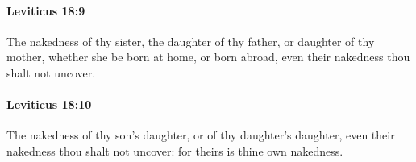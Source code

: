 		\paragraph{Leviticus 18:9} %
			\label{LEVITICUS-18-9}

			The nakedness of thy sister, the daughter of thy father, or daughter of thy mother, whether she be born at home, or born abroad, even their nakedness thou shalt not uncover.


		\paragraph{Leviticus 18:10} %
			\label{LEVITICUS-18-10}

			The nakedness of thy son’s daughter, or of thy daughter’s daughter, even their nakedness thou shalt not uncover: for theirs is thine own nakedness.


